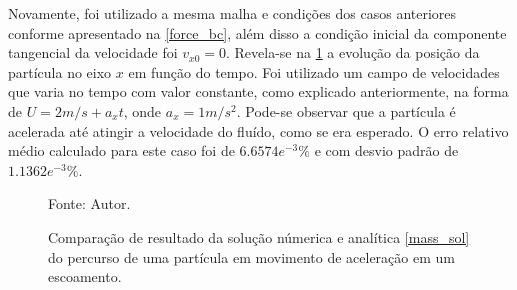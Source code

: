 Novamente, foi utilizado a mesma malha e condições dos casos anteriores conforme apresentado na \ref{force_bc}, além disso a condição inicial da componente tangencial da velocidade foi $v_{x0}=0$.
Revela-se na \ref{mass_comp} a evolução da posição da partícula no eixo $x$ em função do tempo.
Foi utilizado um campo de velocidades que varia no tempo com valor constante, como explicado anteriormente, na forma de $U=2m/s+a_x t$, onde $a_x=1m/s^2$.
Pode-se observar que a partícula é acelerada até atingir a velocidade do fluído, como se era esperado.
O erro relativo médio calculado para este caso foi de $6.6574e^{-3}\%$ e com desvio padrão de $1.1362e^{-3}\%$.
\begin{figure}[H]
    \centering
     {\raggedleft \scriptsize Fonte: Autor.}
    \caption{Comparação de resultado da solução númerica e analítica \ref{mass_sol} do percurso de uma partícula em movimento de aceleração em um escoamento.}
    \label{mass_comp}
\end{figure}